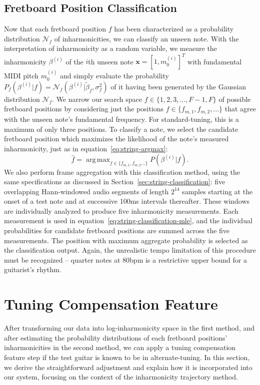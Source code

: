 \documentclass[12pt]{cmuthesis}
\DeclareMathOperator*{\argmax}{arg\,max}
\begin{document}
\subsection{Fretboard Position Classification}
Now that each fretboard position $f$ has been characterized as a probability distribution $\mathcal{N}_f$ of inharmonicities, we can classify an unseen note. With the interpretation of inharmonicity as a random variable, we measure the inharmonicity $\beta^{(i)}$ of the $i$th unseen note $\mathbf{x}=[1,m_0^{(i)}]^T$ with fundamental MIDI pitch $m_0^{(i)}$ and simply evaluate the probability $P_f(\beta^{(i)} | f) = \mathcal{N}_f(\beta^{(i)} | \tilde{\beta}_f,\sigma^2_f)$ of it having been generated by the Gaussian distribution $\mathcal{N}_f$. We narrow our search space $f \in \{1,2,3,...,F-1,F\}$ of possible fretboard positions by considering just the positions $f \in \{f_{m,1},f_{m,2},...\}$ that agree with the unseen note's fundamental frequency. For standard-tuning, this is a maximum of only three positions. To classify a note, we select the candidate fretboard position which maximizes the likelihood of the note's measured inharmonicity, just as in equation~\eqref{eq:string-argmax}:
\begin{equation}
\hat{f} = \argmax_{f\in\{f_{m,1},f_{m,2}...\}}P(\beta^{(i)} | f).
\label{eq:string-classification-mle}
\end{equation}
We also perform frame aggregation with this classification method, using the same specifications as discussed in Section~\ref{sec:string-classification}: five overlapping Hann-windowed audio segments of length $2^{14}$ samples starting at the onset of a test note and at successive 100ms intervals thereafter. These windows are individually analyzed to produce five inharmonicity measurements. Each measurement is used in equation~\eqref{eq:string-classification-mle}, and the individual probabilities for candidate fretboard positions are summed across the five measurements. The position with maximum aggregate probability is selected as the classification output. Again, the unrealistic tempo limitation of this procedure must be recognized -- quarter notes at 80bpm is a restrictive upper bound for a guitarist's rhythm.

\section{Tuning Compensation Feature}
After transforming our data into log-inharmonicity space in the first method, and after estimating the probability distributions of each fretboard positions' inharmonicities in the second method, we can apply a tuning compensation feature step if the test guitar is known to be in alternate-tuning. In this section, we derive the straightforward adjustment and explain how it is incorporated into our system, focusing on the context of the inharmonicity trajectory method.
\end{document}
